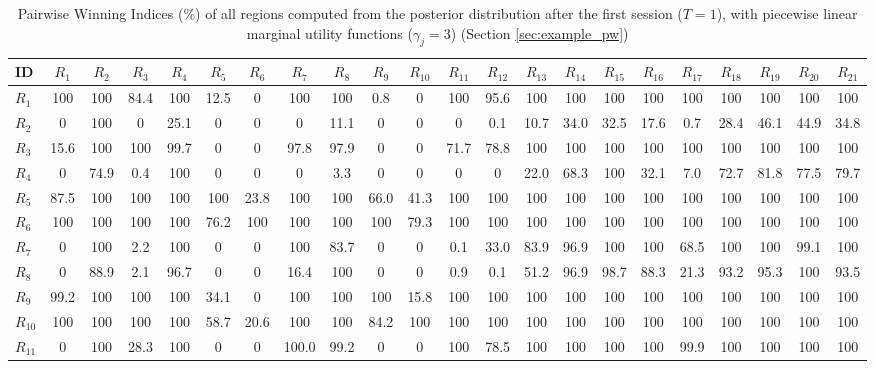 \begin{table}[h!]
\centering
\footnotesize
\caption{Pairwise Winning Indices (\%) of all regions computed from the posterior distribution after the first session ($T=1$), with piecewise linear marginal utility functions ($\gamma_j=3$) (Section \ref{sec:example_pw})}
\label{tab:PWI_pw_t1}
\begin{tabularx}{\textwidth}{X|CCCCCCCCCCCCCCCCCCCCC}
\toprule
ID&$R_{1}$&$R_{2}$&$R_{3}$&$R_{4}$&$R_{5}$&$R_{6}$&$R_{7}$&$R_{8}$&$R_{9}$&$R_{10}$&$R_{11}$&$R_{12}$&$R_{13}$&$R_{14}$&$R_{15}$&$R_{16}$&$R_{17}$&$R_{18}$&$R_{19}$&$R_{20}$&$R_{21}$\\
\midrule
$R_{1}$ & 100 & 100 & 84.4 & 100 & 12.5 & 0 & 100 & 100 & 0.8 & 0 & 100 & 95.6 & 100 & 100 & 100 & 100 & 100 & 100 & 100 & 100 & 100 \\
$R_{2}$ & 0 & 100 & 0 & 25.1 & 0 & 0 & 0 & 11.1 & 0 & 0 & 0 & 0.1 & 10.7 & 34.0 & 32.5 & 17.6 & 0.7 & 28.4 & 46.1 & 44.9 & 34.8 \\
$R_{3}$ & 15.6 & 100 & 100 & 99.7 & 0 & 0 & 97.8 & 97.9 & 0 & 0 & 71.7 & 78.8 & 100 & 100 & 100 & 100 & 100 & 100 & 100 & 100 & 100 \\
$R_{4}$ & 0 & 74.9 & 0.4 & 100 & 0 & 0 & 0 & 3.3 & 0 & 0 & 0 & 0 & 22.0 & 68.3 & 100 & 32.1 & 7.0 & 72.7 & 81.8 & 77.5 & 79.7 \\
$R_{5}$ & 87.5 & 100 & 100 & 100 & 100 & 23.8 & 100 & 100 & 66.0 & 41.3 & 100 & 100 & 100 & 100 & 100 & 100 & 100 & 100 & 100 & 100 & 100 \\
$R_{6}$ & 100 & 100 & 100 & 100 & 76.2 & 100 & 100 & 100 & 100 & 79.3 & 100 & 100 & 100 & 100 & 100 & 100 & 100 & 100 & 100 & 100 & 100 \\
$R_{7}$ & 0 & 100 & 2.2 & 100 & 0 & 0 & 100 & 83.7 & 0 & 0 & 0.1 & 33.0 & 83.9 & 96.9 & 100 & 100 & 68.5 & 100 & 100 & 99.1 & 100 \\
$R_{8}$ & 0 & 88.9 & 2.1 & 96.7 & 0 & 0 & 16.4 & 100 & 0 & 0 & 0.9 & 0.1 & 51.2 & 96.9 & 98.7 & 88.3 & 21.3 & 93.2 & 95.3 & 100 & 93.5 \\
$R_{9}$ & 99.2 & 100 & 100 & 100 & 34.1 & 0 & 100 & 100 & 100 & 15.8 & 100 & 100 & 100 & 100 & 100 & 100 & 100 & 100 & 100 & 100 & 100 \\
$R_{10}$ & 100 & 100 & 100 & 100 & 58.7 & 20.6 & 100 & 100 & 84.2 & 100 & 100 & 100 & 100 & 100 & 100 & 100 & 100 & 100 & 100 & 100 & 100 \\
$R_{11}$ & 0 & 100 & 28.3 & 100 & 0 & 0 & 100.0 & 99.2 & 0 & 0 & 100 & 78.5 & 100 & 100 & 100 & 100 & 99.9 & 100 & 100 & 100 & 100 \\

\end{tabularx}
\end{table}
